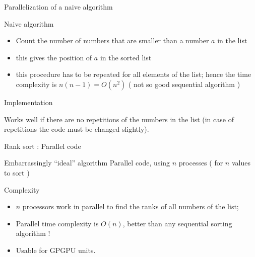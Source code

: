 \documentclass[compress,10pt,aspectratio=169]{beamer}
\begin{document}
\begin{frame}[fragile]{Parallelization of a naive algorithm}
  \scriptsize
  \begin{block}{Naive algorithm}
  \begin{itemize}
  \item Count the number of numbers that are smaller than a number $a$ in the list
  \item this gives the position of $a$ in the sorted list
  \item this procedure has to be repeated for all elements of the list; hence the
        time complexity is $n(n-1)=O(n^{2})$ ( not so good sequential algorithm )
  \end{itemize}
  \end{block}

  \begin{exampleblock}{Implementation}
    \begin{center}
    \end{center}
  \end{exampleblock}

  Works well if there are no repetitions of the numbers in the list (in case
  of repetitions the code must be changed slightly).

\end{frame}


\begin{frame}[fragile]{Rank sort : Parallel code}
  \scriptsize
  \begin{exampleblock}{Embarrassingly ``ideal'' algorithm} 
    Parallel code, using $n$ processes ( for $n$ values to sort )

    \begin{center}
    \end{center}
    \end{exampleblock}

  \begin{block}{Complexity}
    \begin{itemize}
    \item $n$ processors work in parallel to find the ranks of all numbers of the list;
    \item Parallel time complexity is $O(n)$, better than any sequential sorting algorithm !
    \item Usable for GPGPU units.
    \end{itemize}
  \end{block}
\end{frame}
\end{document}
